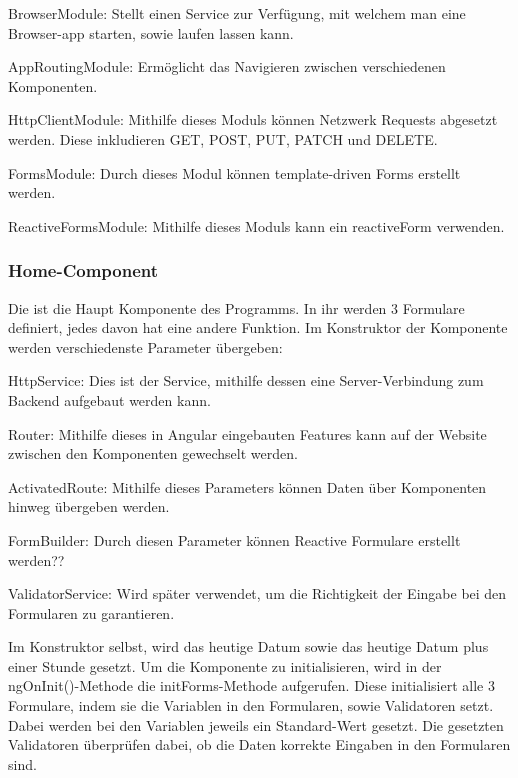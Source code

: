 \begin{compactitem}
    \item BrowserModule: Stellt einen Service zur Verfügung, mit welchem man eine Browser-app starten, sowie laufen lassen kann.    
    \item AppRoutingModule: Ermöglicht das Navigieren zwischen verschiedenen Komponenten.     
    \item HttpClientModule: Mithilfe dieses Moduls können Netzwerk Requests abgesetzt werden. Diese inkludieren GET, POST, PUT, PATCH und DELETE.    
    \item FormsModule: Durch dieses Modul können template-driven Forms erstellt werden.    
    \item ReactiveFormsModule: Mithilfe dieses Moduls kann ein reactiveForm verwenden. 
\end{compactitem}

\subsubsection{Home-Component}
Die ist die Haupt Komponente des Programms. In ihr werden 3 Formulare definiert, jedes davon hat eine andere Funktion. Im Konstruktor der Komponente werden verschiedenste Parameter übergeben:

\begin{compactitem}
    \item HttpService: Dies ist der Service, mithilfe dessen eine Server-Verbindung zum Backend aufgebaut werden kann.    
    \item Router: Mithilfe dieses in Angular eingebauten Features kann auf der Website zwischen den Komponenten gewechselt werden.        
    \item ActivatedRoute: Mithilfe dieses Parameters können Daten über Komponenten hinweg übergeben werden.    
    \item FormBuilder: Durch diesen Parameter können Reactive Formulare erstellt werden??
    \item ValidatorService: Wird später verwendet, um die Richtigkeit der Eingabe bei den Formularen zu garantieren.
\end{compactitem}

Im Konstruktor selbst, wird das heutige Datum sowie das heutige Datum plus einer Stunde gesetzt.
Um die Komponente zu initialisieren, wird in der ngOnInit()-Methode die initForms-Methode aufgerufen. Diese initialisiert alle 3 Formulare, indem sie die Variablen in den Formularen, sowie Validatoren setzt. Dabei werden bei den Variablen jeweils ein Standard-Wert gesetzt. Die gesetzten Validatoren überprüfen dabei, ob die Daten korrekte Eingaben in den Formularen sind. 

